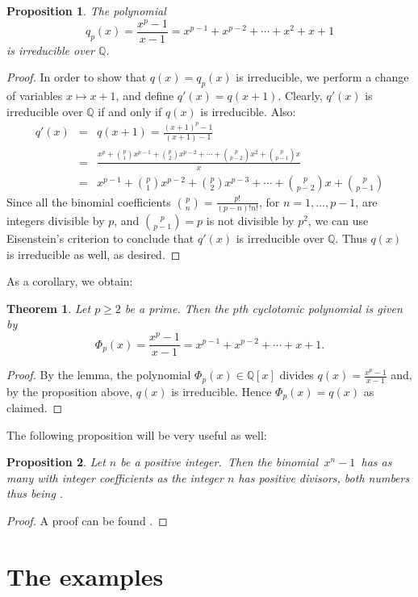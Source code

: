 \documentclass[12pt]{article}
\newtheorem{thm}{Theorem}
\newtheorem{prop}{Proposition}
\theoremstyle{definition}
\newcommand{\Rats}{\mathbb{Q}}
\begin{document}
\begin{prop}
The polynomial $$q_p(x)=\frac{x^p-1}{x-1}=x^{p-1}+x^{p-2}+\cdots+x^2+x+1$$ is irreducible over $\Rats$.
\end{prop}
\begin{proof}
In order to show that $q(x)=q_p(x)$ is irreducible, we perform a change of variables $x\mapsto x+1$, and define $q'(x)=q(x+1)$. Clearly, $q'(x)$ is irreducible over $\Rats$ if and only if $q(x)$ is irreducible. Also:
\begin{eqnarray*}
q'(x) &=& q(x+1)=\frac{(x+1)^p-1}{(x+1)-1}\\
&=& \frac{x^p+{p\choose 1}x^{p-1}+{p\choose 2}x^{p-2}+\cdots +{p\choose p-2}x^2 + {p\choose p-1}x}{x} \\
&=&  
x^{p-1}+{p\choose 1}x^{p-2}+{p\choose 2}x^{p-3}+\cdots +{p\choose p-2}x +{p\choose p-1}
\end{eqnarray*}
Since all the binomial coefficients ${p\choose n} = \frac{p!}{(p-n)!n!}$, for $n=1,\ldots,p-1$, are integers divisible by $p$, and ${p\choose p-1}=p$ is not divisible by $p^2$, we can use Eisenstein's criterion to conclude that $q'(x)$ is irreducible over $\Rats$. Thus $q(x)$ is irreducible as well, as desired.
\end{proof}

As a corollary, we obtain:

\begin{thm}
Let $p\geq 2$ be a prime. Then  the $p$th cyclotomic polynomial is given by $$\Phi_p(x)=\frac{x^p-1}{x-1}=x^{p-1}+x^{p-2}+\cdots+x+1.$$
\end{thm}
\begin{proof}
By the lemma, the polynomial $\Phi_p(x)\in \Rats[x]$ divides $q(x)=\frac{x^p-1}{x-1}$ and, by the proposition above, $q(x)$ is irreducible. Hence $\Phi_p(x)=q(x)$ as claimed. 
\end{proof}

The following proposition will be very useful as well:
\begin{prop}
Let $n$ be a positive integer.\, Then the binomial\, $x^n\!-\!1$\, has as many  with integer coefficients as the integer $n$ has positive divisors, both numbers thus being .
\end{prop}
\begin{proof}
A proof can be found .
\end{proof}

\section{The examples}
\end{document}
